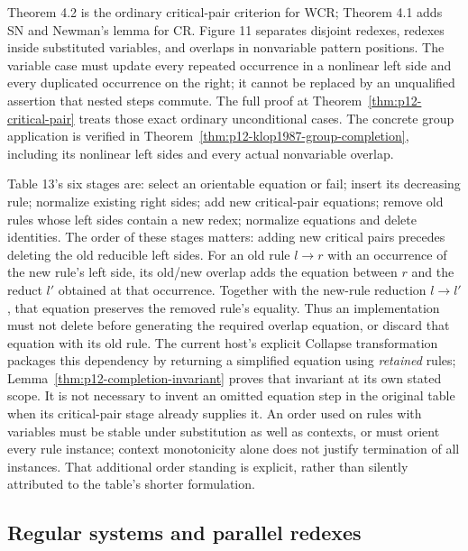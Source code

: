 Theorem 4.2 is the ordinary critical-pair criterion for WCR; Theorem 4.1
adds SN and Newman's lemma for CR. Figure 11 separates disjoint redexes,
redexes inside substituted variables, and overlaps in nonvariable pattern
positions. The variable case must update every repeated occurrence in a
nonlinear left side and every duplicated occurrence on the right; it cannot
be replaced by an unqualified assertion that nested steps commute.
The full proof at Theorem~\ref{thm:p12-critical-pair} treats those exact
ordinary unconditional cases. The concrete group application is verified
in Theorem~\ref{thm:p12-klop1987-group-completion}, including its
nonlinear left sides and every actual nonvariable overlap.

Table 13's six stages are: select an orientable equation or fail; insert its
decreasing rule; normalize existing right sides; add new critical-pair
equations; remove old rules whose left sides contain a new redex;
normalize equations and delete identities. The order of these stages
matters: adding new critical pairs precedes deleting the old reducible
left sides. For an old rule \(l\to r\) with an occurrence of the
new rule's left side, its old/new overlap adds the equation between
\(r\) and the reduct \(l'\) obtained at that occurrence.
Together with the new-rule reduction \(l\to l'\), that equation
preserves the removed rule's equality. Thus an implementation must not
delete before generating the required overlap equation, or discard
that equation with its old rule. The current host's explicit Collapse
transformation packages this dependency by returning a simplified
equation using \emph{retained} rules;
Lemma~\ref{thm:p12-completion-invariant} proves that invariant at its
own stated scope. It is not necessary to invent an omitted equation
step in the original table when its critical-pair stage already supplies it.
An order used on rules with variables must be stable under
substitution as well as contexts, or must orient every rule instance;
context monotonicity alone does not justify termination of all instances.
That additional order standing is explicit, rather than silently
attributed to the table's shorter formulation.

\subsection{Regular systems and parallel redexes}

